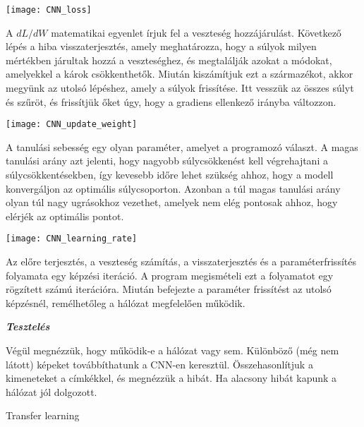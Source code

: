 \begin{center}
\texttt{[image: CNN\_loss]}
\end{center}

A $dL/dW$ matematikai egyenlet írjuk fel a veszteség hozzájárulást. Következő lépés a hiba visszaterjesztés, amely meghatározza, hogy a súlyok milyen mértékben járultak hozzá a veszteséghez, és megtalálják azokat a módokat, amelyekkel a károk csökkenthetők. Miután kiszámítjuk ezt a származékot, akkor megyünk az utolsó lépéshez, amely a súlyok frissítése. Itt vesszük az összes súlyt és szűröt, és frissítjük őket úgy, hogy a gradiens ellenkező irányba változzon.

\begin{center}
\texttt{[image: CNN\_update\_weight]}
\end{center}

A tanulási sebesség egy olyan paraméter, amelyet a programozó választ. A magas tanulási arány azt jelenti, hogy nagyobb súlycsökkenést kell végrehajtani a súlycsökkentésekben, így kevesebb időre lehet szükség ahhoz, hogy a modell konvergáljon az optimális súlycsoporton. Azonban a túl magas tanulási arány olyan túl nagy ugrásokhoz vezethet, amelyek nem elég pontosak ahhoz, hogy elérjék az optimális pontot.

\begin{center}
\texttt{[image: CNN\_learning\_rate]}
\end{center}

Az előre terjesztés, a veszteség számítás, a visszaterjesztés és a paraméterfrissítés folyamata egy képzési iteráció. A program megismételi ezt a folyamatot egy rögzített számú iterációra. Miután befejezte a paraméter frissítést az utolsó képzésnél, remélhetőleg a hálózat megfelelően működik.\\

\begin{flushleft}
\textit{\textbf{Tesztelés}}
\end{flushleft}

Végül megnézzük, hogy működik-e a hálózat vagy sem. Különböző (még nem látott) képeket továbbíthatunk a CNN-en keresztül. Összehasonlítjuk a kimeneteket a címkékkel, és megnézzük a hibát. Ha alacsony hibát kapunk a hálózat jól dolgozott.

\begin{flushleft}
{\Large Transfer learning}
\end{flushleft}

